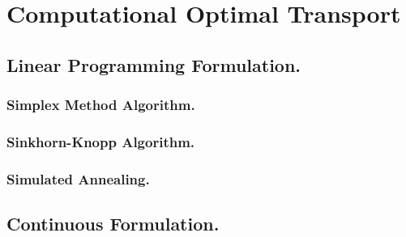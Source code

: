 \chapter{Computational Optimal Transport}
\section{Linear Programming Formulation.}
\subsection{Simplex Method Algorithm.}
\subsection{Sinkhorn-Knopp Algorithm.}
\subsection{Simulated Annealing.}
\section{Continuous Formulation.}

